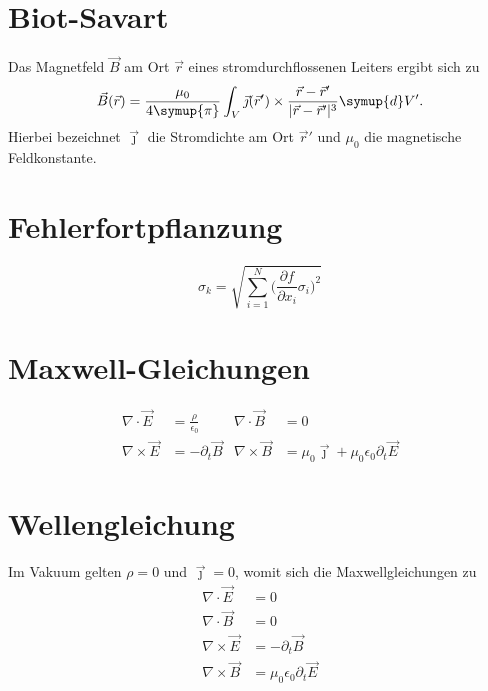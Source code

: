\documentclass{scrartcl}
\begin{document}
\section{Biot-Savart}
  Das Magnetfeld $\vec{B}$ am Ort $\vec{r}$ eines
  stromdurchflossenen Leiters
  ergibt sich zu
\begin{equation}
  \vec{B}(\vec{r})= \frac{\mu_0}%
  {4\symup{\pi}}%
  \int_V \vec{\jmath}(\vec{r}') \times \frac{\vec{r}-\vec{r}'}
  {\lvert \vec{r} - \vec{r}'\rvert^3}
  \symup{d}V'.
\end{equation}
Hierbei bezeichnet $\vec{\jmath}$ die Stromdichte am Ort $\vec{r}'$
 und $\mu_0$ die magnetische Feldkonstante.

 \section{Fehlerfortpflanzung}
 \begin{equation}
\sigma_k = \sqrt{\sum_{i=1}^N \Biggl(\frac{\partial{f}}{\partial{x_i}}
\sigma_i\Biggr)^2}
 \end{equation}

 \section{Maxwell-Gleichungen}
 \begin{align}
\nabla\cdot\vec{E} &= \frac{\rho}{\epsilon_0} &
\nabla\cdot\vec{B} &= 0 \\ %
\nabla\times\vec{E} &= -\partial_t{\vec{B}} &
\nabla\times\vec{B} &= \mu_0\vec{\jmath} + \mu_0\epsilon_0\partial_t{\vec{E}}
 \end{align}

 \section{Wellengleichung}
Im Vakuum gelten $\rho=0$ und $\vec{\jmath}=0$, womit sich die
Maxwellgleichungen zu
 \begin{align}
\nabla\cdot\vec{E} &= 0 \\
\nabla\cdot\vec{B} &= 0 \\
\nabla\times\vec{E} &= -\partial_t\vec{B}\\
\nabla\times\vec{B} &= \mu_0\epsilon_0\partial_t{\vec{E}}
 \end{align}
\end{document}
